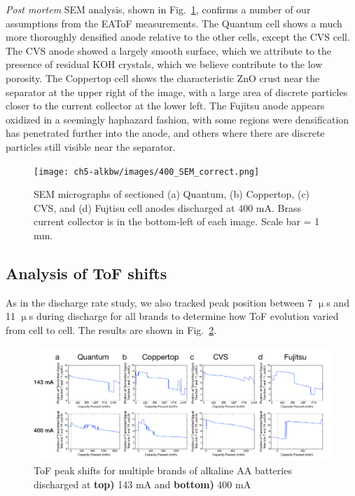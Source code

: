 \textit{Post mortem} SEM analysis, shown in Fig.~\ref{fig:400sem}, confirms a number of our assumptions from the EAToF measurements. The Quantum cell shows a much more thoroughly densified anode relative to the other cells, except the CVS cell. The CVS anode showed a largely smooth surface, which we attribute to the presence of residual KOH crystals, which we believe contribute to the low porosity. The Coppertop cell shows the characteristic ZnO crust near the separator at the upper right of the image, with a large area of discrete particles closer to the current collector at the lower left. The Fujitsu anode appears oxidized in a seemingly haphazard fashion, with some regions were densification has penetrated further into the anode, and others where there are discrete particles still visible near the separator.

\begin{figure}[htb]
  \centering
    \texttt{[image: ch5-alkbw/images/400\_SEM\_correct.png]}
    \caption[SEM micrographs of multiple brands of alkaline AA anodes after discharge at 143 mA.]{SEM micrographs of sectioned (a) Quantum, (b) Coppertop, (c) CVS, and (d) Fujtisu cell anodes discharged at 400 mA. Brass current collector is in the bottom-left of each image. Scale bar = 1 mm.}
    \label{fig:400sem}
\end{figure}

\subsection{Analysis of ToF shifts}

As in the discharge rate study, we also tracked peak position between 7 $\upmu$s and 11 $\upmu$s during discharge for all brands to determine how ToF evolution varied from cell to cell. The results are shown in Fig.~\ref{fig:brandpeak}.

\begin{figure}[htb]
  \centering
    \includegraphics[width=\textwidth]{ch5-alkbw/images/BrandCompEAToF_PeakPos.png}
    \caption[ToF peak shifts for multiple brands of alkaline AA batteries.]{ToF peak shifts for multiple brands of alkaline AA batteries discharged at \textbf{top)} 143 mA and \textbf{bottom)} 400 mA}
    \label{fig:brandpeak}
\end{figure}

